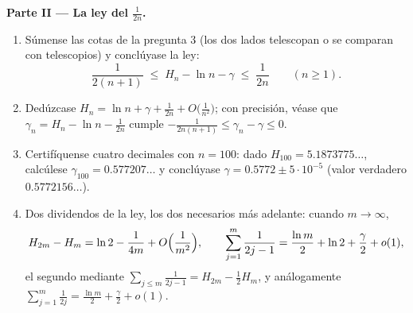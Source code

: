 \begin{problem}[{Problema del fin de semana --- $H_n = \ln n + \gamma +
\frac{1}{2n} + O(n^{-2})$, y la reordenación de
$1 - \frac12 + \frac13 - \dots$ hasta $\frac{\ln 2}{2}$}]
\medskip
\noindent\textbf{Parte II --- La ley del $\frac{1}{2n}$.}
\begin{enumerate}[resume]
  \item Súmense las cotas de la pregunta 3 (los dos lados telescopan
        o se comparan con telescopios) y conclúyase la ley:
        \[
        \frac{1}{2(n+1)} \;\leq\; H_n - \ln n - \gamma \;\leq\;
        \frac{1}{2n} \qquad (n \geq 1).
        \]
  \item Dedúzcase $H_n = \ln n + \gamma + \frac{1}{2n} +
        O\bigl(\frac{1}{n^2}\bigr)$; con precisión, véase que
        $\gamma_n = H_n - \ln n - \frac{1}{2n}$ cumple
        $-\frac{1}{2n(n+1)} \leq \gamma_n - \gamma \leq 0$.
  \item Certifíquense cuatro decimales con $n = 100$: dado
        $H_{100} = 5.1873775\dots$, calcúlese
        $\gamma_{100} = 0.577207\dots$ y conclúyase
        $\gamma = 0.5772 \pm 5\cdot10^{-5}$ (valor verdadero
        $0.5772156\dots$).
  \item Dos dividendos de la ley, los dos necesarios más adelante:
        cuando $m \to \infty$,
        \[
        H_{2m} - H_m = \ln 2 - \frac{1}{4m} +
        O\Bigl(\frac{1}{m^2}\Bigr),
        \qquad
        \sum_{j=1}^{m} \frac{1}{2j-1} = \frac{\ln m}{2} + \ln 2
        + \frac\gamma2 + o(1) ,
        \]
        el segundo mediante
        $\sum_{j \leq m} \frac{1}{2j-1} = H_{2m} - \frac12 H_m$, y
        análogamente
        $\sum_{j=1}^{m} \frac{1}{2j} = \frac{\ln m}{2} +
        \frac\gamma2 + o(1)$.
\end{enumerate}


\end{problem}
